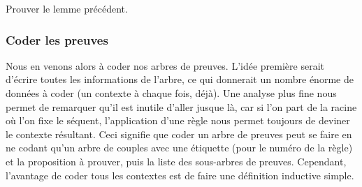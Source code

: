 \begin{exo}
    Prouver le lemme précédent.
\end{exo}

\subsubsection{Coder les preuves}

Nous en venons alors à coder nos arbres de preuves. L'idée première serait d'écrire toutes les informations de l'arbre, ce qui donnerait un nombre énorme de données à coder (un contexte à chaque fois, déjà). Une analyse plus fine nous permet de remarquer qu'il est inutile d'aller jusque là, car si l'on part de la racine où l'on fixe le séquent, l'application d'une règle nous permet toujours de deviner le contexte résultant. Ceci signifie que coder un arbre de preuves peut se faire en ne codant qu'un arbre de couples avec une étiquette (pour le numéro de la règle) et la proposition à prouver, puis la liste des sous-arbres de preuves. Cependant, l'avantage de coder tous les contextes est de faire une définition inductive simple.

